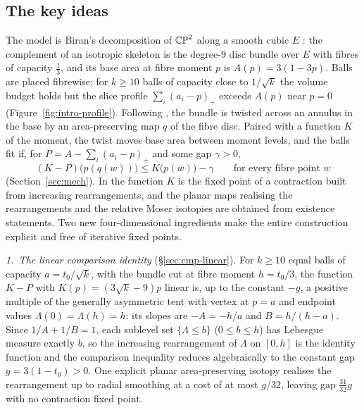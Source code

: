 \subsection{The key ideas}\label{sec:intro-mechanism}

The model is Biran's decomposition of $\mathbb{CP}^2$ along a smooth cubic $E$ \cite{Biran2001}: the complement of an
isotropic skeleton is the degree-$9$ disc bundle over $E$ with fibres of capacity $\frac13$, and its base area at
fibre moment $p$ is $A(p)=3(1-3p)$. Balls are placed fibrewise; for $k\ge10$ balls of capacity close to $1/\sqrt k$ the
volume budget holds but the slice profile $\sum_i(a_i-p)_+$ exceeds $A(p)$ near $p=0$ (Figure~\ref{fig:intro-profile}).
Following \cite{OpenAI2026}, the bundle is twisted across an annulus in the base by an area-preserving map $q$ of the
fibre disc. Paired with a function $K$ of the moment, the twist moves base area between moment levels, and the balls fit
if, for $P=A-\sum_i(a_i-p)_+$ and some gap $\gamma>0$,
\[
 (K-P)\bigl(p(q(w))\bigr)\le K\bigl(p(w)\bigr)-\gamma\qquad\text{for every fibre point }w
\]
(Section~\ref{sec:mech}). In \cite{OpenAI2026} the function $K$ is the fixed point of a contraction built from
increasing rearrangements, and the planar maps realising the rearrangements and the relative Moser isotopies are
obtained from existence statements. Two new four-dimensional ingredients make the entire construction explicit and free
of iterative fixed points.

\emph{1.\ The linear comparison identity} (\S\ref{sec:cmp-linear}). For $k\ge10$ equal balls of capacity $a=t_0/\sqrt k$,
with the bundle cut at fibre moment $h=t_0/3$, the function $K-P$ with $K(p)=(3\sqrt k-9)p$ linear is, up to the
constant $-g$, a positive multiple of the generally asymmetric tent with vertex at $p=a$ and endpoint values
$\Lambda(0)=\Lambda(h)=h$: its slopes are $-A=-h/a$ and $B=h/(h-a)$. Since $1/A+1/B=1$,
each sublevel set $\{\Lambda\le b\}$ ($0\le b\le h$) has Lebesgue
measure exactly $b$, so the increasing rearrangement of $\Lambda$ on $[0,h]$ is the identity function and the comparison
inequality reduces algebraically to the constant gap $g=3(1-t_0)>0$. One explicit planar area-preserving isotopy realises
the rearrangement up to radial smoothing at a cost of at most $g/32$, leaving gap $\frac{31}{32}g$ with no contraction
fixed point.

